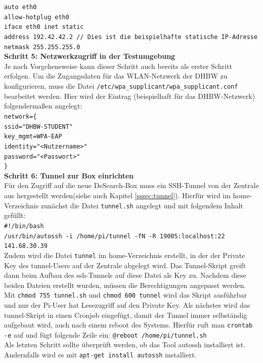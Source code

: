 \texttt{auto eth0\\
	allow-hotplug eth0\\
	iface eth0 inet static\\
	address 192.42.42.2 // Dies ist die beispielhafte statische IP-Adresse\\
	netmask 255.255.255.0}\\
\textbf{Schritt 5: Netzwerkzugriff in der Testumgebung}\\
Je nach Vorgehensweise kann dieser Schritt auch bereits als erster Schritt erfolgen. Um die Zugangsdaten für das WLAN-Netzwerk der DHBW zu konfigurieren, muss die Datei \texttt{/etc/wpa\_supplicant/wpa\_supplicant.conf} bearbeitet werden. Hier wird der Eintrag (beispielhaft für das DHBW-Netzwerk) folgendermaßen angelegt:\\
\texttt{network=\{\\
	\tab ssid="DHBW-STUDENT"\\
	\tab key\_mgmt=WPA-EAP\\
	\tab identity="<Nutzername>"\\
	\tab password="<Passwort>"\\
	\}}\\
\textbf{Schritt 6: Tunnel zur Box einrichten}\\
Für den Zugriff auf die neue DeSearch-Box muss ein SSH-Tunnel von der Zentrale aus hergestellt werden(siehe auch Kapitel \ref{sssec:tunnel}). Hierfür wird im home-Verzeichnis zunächst die Datei \texttt{tunnel.sh} angelegt und mit folgendem Inhalt gefüllt:\\
\texttt{\#!/bin/bash\\
	/usr/bin/autossh -i /home/pi/tunnel -fN -R 19005:localhost:22 141.68.30.39}\\
Zudem wird die Datei \texttt{tunnel} im home-Verzeichnis erstellt, in der der Private Key des tunnel-Users auf der Zentrale abgelegt wird. Das Tunnel-Skript greift dann beim Aufbau des ssh-Tunnels auf diese Datei als Key zu. Nachdem diese beiden Dateien erstellt wurden, müssen die Berechtigungen angepasst werden. Mit \texttt{chmod 755 tunnel.sh} und \texttt{chmod 600 tunnel} wird das Skript ausführbar und nur der Pi-User hat Lesezugriff auf den Private Key. Als nächstes wird das tunnel-Skript in einen Cronjob eingefügt, damit der Tunnel immer selbständig aufgebaut wird, auch nach einem reboot des Systems. Hierfür ruft man \texttt{crontab -e} auf und fügt folgende Zeile ein: \texttt{@reboot /home/pi/tunnel.sh}\\
Als letzten Schritt sollte überprüft werden, ob das Tool autossh installiert ist. Andernfalls wird es mit \texttt{apt-get install autossh} installiert.\\
